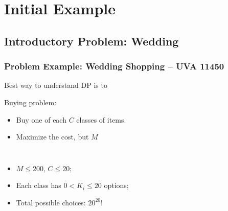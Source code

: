 \documentclass{beamer}
\begin{document}
\section{Initial Example}

\subsection{Introductory Problem: Wedding}

\begin{frame}
    \frametitle{Problem Example: Wedding Shopping -- UVA 11450}

    \begin{block}{}
      Best way to understand DP is to 
    \end{block}

    \vfill
    
    Buying problem:
    \begin{itemize}
    \item Buy one of each $C$ classes of items.
    \item Maximize the cost, but  $M$
    \end{itemize}

    \medskip

    \begin{columns}
      \begin{itemize}
      \item $M \leq 200$, $C \leq 20$;
      \item Each class has $0 < K_i \leq 20$ options;
      \item Total possible choices: $20^{20}$!
      \end{itemize}


\end{columns}
\end{frame}
\end{document}
